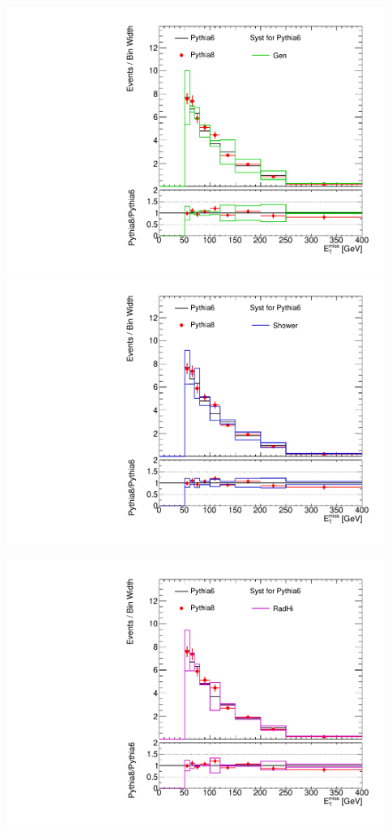 \begin{figure}[!h]
\begin{center}
\includegraphics[scale=0.33]{./figures/boosted/TTBarPy6VsPy8/TTBarPy6VsPy8_SR_MET_gen}  
\includegraphics[scale=0.33]{./figures/boosted/TTBarPy6VsPy8/TTBarPy6VsPy8_SR_MET_shower} \\
\par\medskip
\includegraphics[scale=0.33]{./figures/boosted/TTBarPy6VsPy8/TTBarPy6VsPy8_SR_MET_radhi}

\end{center}
\end{figure}
